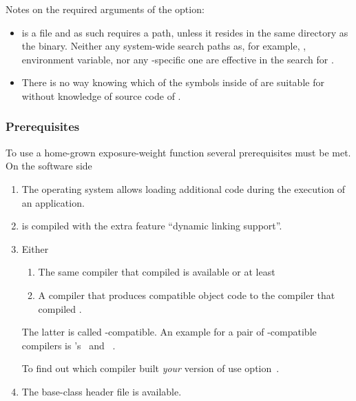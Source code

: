 Notes on the required arguments of the option:
\begin{itemize}
\item
   is a file and as such requires a path,
  unless it resides in the same directory as the \App{} binary.
  Neither any system-wide search paths as, for example,
  ,%
         {environment variable, } nor
  any \App-specific one are effective in the search for
  .
\item
  There is no way knowing which of the symbols inside of
   are suitable for  without
  knowledge of source code of .
\end{itemize}


\subsubsection[Prerequisites]{Prerequisites
  \label{sec:prerequisites}
  }

To use a home-grown exposure-weight function several prerequisites
must be met.  On the software side

\begin{enumerate}
\item
  The operating system allows loading additional code during the
  execution of an application.

\item
  \App{} is compiled with the extra feature ``dynamic linking
  support''.

\item
  Either
  \begin{enumerate}
  \item
    The same compiler that compiled \App{} is available or at least
  \item
    A compiler that produces compatible object code to the compiler
    that compiled \App{}.
  \end{enumerate}
  The latter is called -compatible.  An example for a
  pair of -compatible compilers is
  's~ and
  ~.

  To find out which compiler built \emph{your} version of \app{} use
  option~.

\item
  The base-class header file  is
  available.
\end{enumerate}

